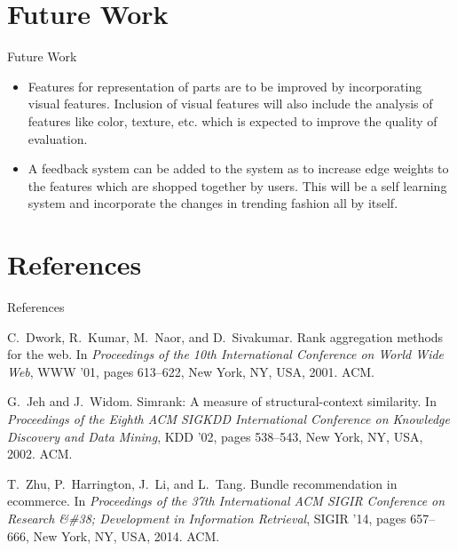 \documentclass[10pt]{beamer}
\begin{document}
\section{Future Work}
\begin{frame}{Future Work}

\begin{itemize}

\item Features for representation of parts are to be improved by incorporating visual features. Inclusion of visual features will also include the analysis of features like color, texture, etc. which is expected to improve the quality of evaluation.

\item A feedback system can be added to the system as to increase edge weights to the features which are shopped together by users. This will be a self learning system and incorporate the changes in trending fashion all by itself.

\end{itemize}

\end{frame}

\section{References}
\begin{frame}{References}


%

\begin{thebibliography}{1}

C.~Dwork, R.~Kumar, M.~Naor, and D.~Sivakumar.
\newblock Rank aggregation methods for the web.
\newblock In {\em Proceedings of the 10th International Conference on World
  Wide Web}, WWW '01, pages 613--622, New York, NY, USA, 2001. ACM.

G.~Jeh and J.~Widom.
\newblock Simrank: A measure of structural-context similarity.
\newblock In {\em Proceedings of the Eighth ACM SIGKDD International Conference
  on Knowledge Discovery and Data Mining}, KDD '02, pages 538--543, New York,
  NY, USA, 2002. ACM.

T.~Zhu, P.~Harrington, J.~Li, and L.~Tang.
\newblock Bundle recommendation in ecommerce.
\newblock In {\em Proceedings of the 37th International ACM SIGIR Conference on
  Research \&\#38; Development in Information Retrieval}, SIGIR '14, pages
  657--666, New York, NY, USA, 2014. ACM.

\end{thebibliography}
\end{frame}


{\1
\begin{frame}
\end{frame}}
\end{document}
